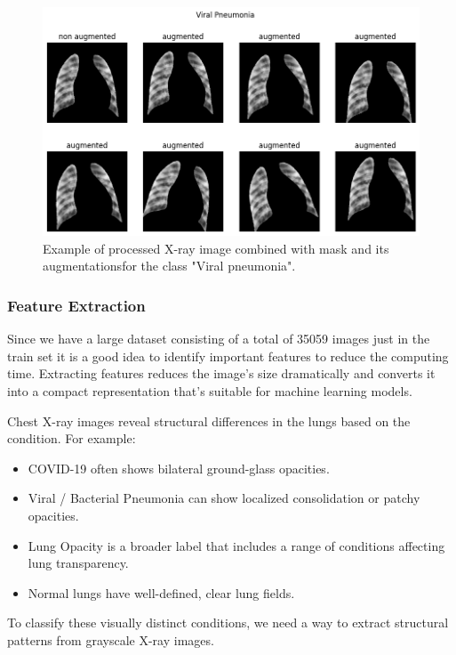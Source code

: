 \documentclass{article}
\begin{document}
\begin{figure}[!htb] %
    \centering
    \includegraphics[width=1.0\linewidth]{aug_example_viral_pn.png}
    \caption{Example of processed X-ray image combined with mask and its augmentationsfor the class "Viral pneumonia".}
    \label{fig:aug_example_viral_pn}
\end{figure}


\subsubsection{Feature Extraction}
Since we have a large dataset consisting of a total of 35059 images just in the train set it is a good idea to identify important features to reduce the computing time.
Extracting features reduces the image's size dramatically and converts it into a compact representation that's suitable for machine learning models. 

Chest X-ray images reveal structural differences in the lungs based on the condition. For example:
\begin{itemize}
    \item COVID-19 often shows bilateral ground-glass opacities.
    \item Viral / Bacterial Pneumonia can show localized consolidation or patchy opacities.
    \item Lung Opacity is a broader label that includes a range of conditions affecting lung transparency.
    \item Normal lungs have well-defined, clear lung fields.
\end{itemize}

\vspace{0.5cm}

To classify these visually distinct conditions, we need a way to extract structural patterns from grayscale X-ray images.\\
\end{document}
